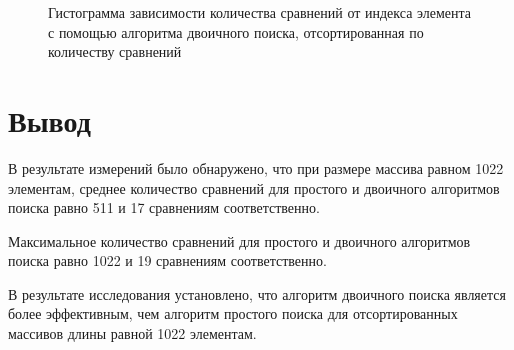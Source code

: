 \begin{figure}[h!]
	
	\caption{Гистограмма зависимости количества сравнений от индекса элемента с помощью алгоритма двоичного поиска, отсортированная по количеству сравнений}
	\label{fig:binary_graph_sorted}
\end{figure}

\section{Вывод}

В результате измерений было обнаружено, что при размере массива равном 1022 элементам, среднее количество сравнений для простого и двоичного алгоритмов поиска равно 511 и 17 сравнениям соответственно. 

Максимальное количество сравнений для простого и двоичного алгоритмов поиска равно 1022 и 19 сравнениям соответственно.

В результате исследования установлено, что алгоритм двоичного поиска является более эффективным, чем алгоритм простого поиска для отсортированных массивов длины равной 1022 элементам. 

\clearpage